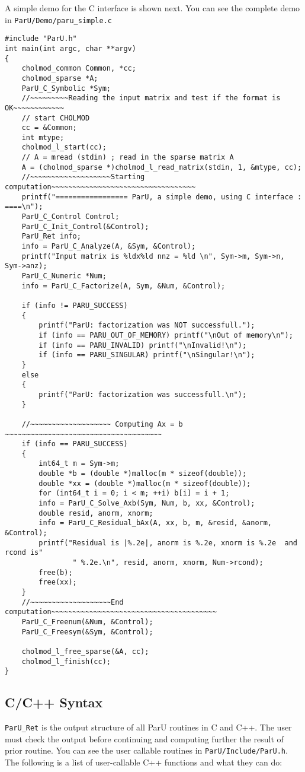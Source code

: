 \documentclass[12pt]{article}
\begin{document}
A simple demo for the C interface is shown next. You can see the complete demo
in \verb'ParU/Demo/paru_simple.c'
\begin{verbatim}
#include "ParU.h"
int main(int argc, char **argv)
{
    cholmod_common Common, *cc;
    cholmod_sparse *A;
    ParU_C_Symbolic *Sym;
    //~~~~~~~~~Reading the input matrix and test if the format is OK~~~~~~~~~~~~
    // start CHOLMOD
    cc = &Common;
    int mtype;
    cholmod_l_start(cc);
    // A = mread (stdin) ; read in the sparse matrix A
    A = (cholmod_sparse *)cholmod_l_read_matrix(stdin, 1, &mtype, cc);
    //~~~~~~~~~~~~~~~~~~~Starting computation~~~~~~~~~~~~~~~~~~~~~~~~~~~~~~~~~~
    printf("================= ParU, a simple demo, using C interface : ====\n");
    ParU_C_Control Control;
    ParU_C_Init_Control(&Control);
    ParU_Ret info;
    info = ParU_C_Analyze(A, &Sym, &Control);
    printf("Input matrix is %ldx%ld nnz = %ld \n", Sym->m, Sym->n, Sym->anz);
    ParU_C_Numeric *Num;
    info = ParU_C_Factorize(A, Sym, &Num, &Control);

    if (info != PARU_SUCCESS)
    {
        printf("ParU: factorization was NOT successfull.");
        if (info == PARU_OUT_OF_MEMORY) printf("\nOut of memory\n");
        if (info == PARU_INVALID) printf("\nInvalid!\n");
        if (info == PARU_SINGULAR) printf("\nSingular!\n");
    }
    else
    {
        printf("ParU: factorization was successfull.\n");
    }

    //~~~~~~~~~~~~~~~~~~~ Computing Ax = b ~~~~~~~~~~~~~~~~~~~~~~~~~~~~~~~~~~~~~
    if (info == PARU_SUCCESS)
    {
        int64_t m = Sym->m;
        double *b = (double *)malloc(m * sizeof(double));
        double *xx = (double *)malloc(m * sizeof(double));
        for (int64_t i = 0; i < m; ++i) b[i] = i + 1;
        info = ParU_C_Solve_Axb(Sym, Num, b, xx, &Control);
        double resid, anorm, xnorm;
        info = ParU_C_Residual_bAx(A, xx, b, m, &resid, &anorm, &Control);
        printf("Residual is |%.2e|, anorm is %.2e, xnorm is %.2e  and rcond is"
                " %.2e.\n", resid, anorm, xnorm, Num->rcond);
        free(b);
        free(xx);
    }
    //~~~~~~~~~~~~~~~~~~~End computation~~~~~~~~~~~~~~~~~~~~~~~~~~~~~~~~~~~~~~~
    ParU_C_Freenum(&Num, &Control);
    ParU_C_Freesym(&Sym, &Control);

    cholmod_l_free_sparse(&A, cc);
    cholmod_l_finish(cc);
}
\end{verbatim}

\subsection{C/C++ Syntax}
\verb'ParU_Ret' is the output structure of all ParU routines in C and C++.  The 
user must check the output before continuing and computing further the result of
prior routine. You can see the user callable routines in 
\verb'ParU/Include/ParU.h'.
The following is a list of user-callable C++ functions and what they
can do:
\end{document}

